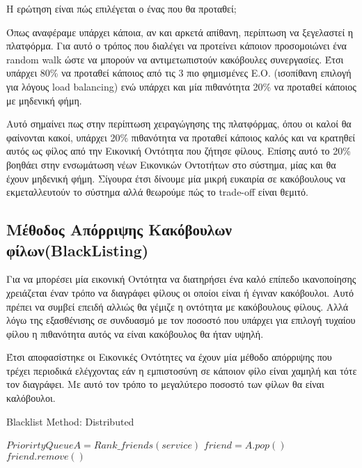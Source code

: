 Η ερώτηση είναι πώς επιλέγεται ο ένας που θα προταθεί;

Όπως αναφέραμε υπάρχει κάποια, αν και αρκετά απίθανη, περίπτωση να ξεγελαστεί η πλατφόρμα. Για αυτό ο τρόπος που διαλέγει να προτείνει κάποιον προσομοιώνει ένα random walk ώστε να μπορούν να αντιμετωπιστούν κακόβουλες συνεργασίες. Έτσι υπάρχει 80\% να προταθεί κάποιος από τις 3 πιο φημισμένες Ε.Ο. (ισοπίθανη επιλογή για λόγους load balancing) ενώ υπάρχει και μία πιθανότητα 20\% να προταθεί κάποιος με μηδενική φήμη.

Αυτό σημαίνει πως στην περίπτωση χειραγώγησης της πλατφόρμας, όπου οι καλοί θα φαίνονται κακοί, υπάρχει 20\% πιθανότητα να προταθεί κάποιος καλός και να  κρατηθεί αυτός ως φίλος από την Εικονική Οντότητα που ζήτησε φίλους. Επίσης αυτό το 20\% βοηθάει στην ενσωμάτωση νέων Εικονικών Οντοτήτων στο σύστημα, μίας και θα έχουν μηδενική φήμη.
Σίγουρα έτσι δίνουμε μία μικρή ευκαιρία σε κακόβουλους να εκμεταλλευτούν το σύστημα αλλά θεωρούμε πώς το trade-off είναι θεμιτό.
\newpage

\subsection{Μέθοδος Απόρριψης Κακόβουλων φίλων(BlackListing)}\label{sec:blacklisting}

Για να μπορέσει μία εικονική Οντότητα να διατηρήσει ένα καλό επίπεδο ικανοποίησης χρειάζεται έναν τρόπο να διαγράφει φίλους οι οποίοι είναι ή έγιναν κακόβουλοι. Αυτό πρέπει να συμβεί επειδή αλλιώς θα γέμιζε η οντότητα με κακόβουλους φίλους. Αλλά λόγω της εξασθένισης σε συνδυασμό με τον ποσοστό που υπάρχει για επιλογή τυχαίου φίλου η πιθανότητα αυτός να είναι κακόβουλος θα ήταν υψηλή.

Έτσι αποφασίστηκε οι Εικονικές Οντότητες να έχουν μία μέθοδο απόρριψης που τρέχει περιοδικά ελέγχοντας εάν η εμπιστοσύνη σε κάποιον φίλο είναι χαμηλή και τότε τον διαγράφει. Με αυτό τον τρόπο το μεγαλύτερο ποσοστό των φίλων θα είναι καλόβουλοι.
\begin{algorithm}
\caption{Blacklist Method: Distributed}
\label{blacklist}
\begin{algorithmic}[1]
\State $ Priorirty Queue A =  Rank\_friends\left(service\right)$
\State $friend=A.pop\left(\right)$
\State $friend.remove\left(\right)$
\EndIf
\EndWhile
\EndFor
\EndProcedure
\end{algorithmic}
\end{algorithm}



